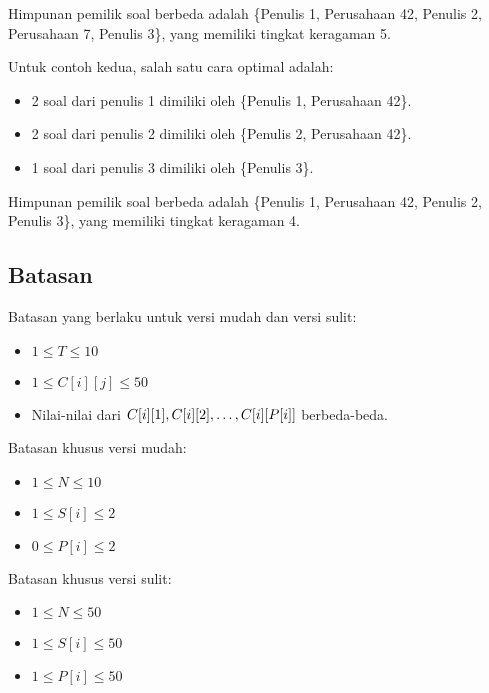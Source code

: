 \documentclass[../main_problemset.tex]{subfiles} %
\begin{document}
Himpunan pemilik soal berbeda adalah \{Penulis 1, Perusahaan 42, Penulis 2, Perusahaan 7, Penulis 3\}, yang memiliki tingkat keragaman 5.

Untuk contoh kedua, salah satu cara optimal adalah:

\begin{itemize}
	\item 2 soal dari penulis 1 dimiliki oleh \{Penulis 1, Perusahaan 42\}.
	\item 2 soal dari penulis 2 dimiliki oleh \{Penulis 2, Perusahaan 42\}.
	\item 1 soal dari penulis 3 dimiliki oleh \{Penulis 3\}.
\end{itemize}

Himpunan pemilik soal berbeda adalah \{Penulis 1, Perusahaan 42, Penulis 2, Penulis 3\}, yang memiliki tingkat keragaman 4.

\subsection*{Batasan}

\begin{minipage}[t]{0.47\textwidth}

Batasan yang berlaku untuk versi mudah dan versi sulit:

\begin{itemize}
	\item $ 1 \le T \le 10 $
	\item $ 1 \le C[i][j] \le 50 $
	\item Nilai-nilai dari $ C[i][1], C[i][2], \mathellipsis, C[i][P[i]] $ berbeda-beda.
\end{itemize}
\end{minipage}
\begin{minipage}[t]{0.06\textwidth}
    \hfill
\end{minipage}
\begin{minipage}[t]{0.47\textwidth}
Batasan khusus versi mudah:

\begin{itemize}
	\item $1 \le N \le 10$
	\item $1 \le S[i] \le 2$
	\item $0 \le P[i] \le 2$
\end{itemize}

\vspace{.2cm}

Batasan khusus versi sulit:

\begin{itemize}
	\item $1 \le N \le 50$
	\item $1 \le S[i] \le 50$
	\item $1 \le P[i] \le 50$
\end{itemize}
\end{minipage}
\end{document}
